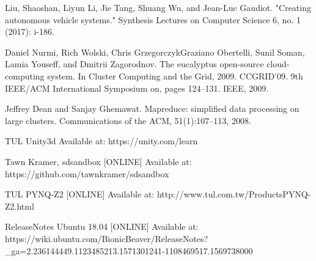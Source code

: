 \documentclass[conference]{IEEEtran}
\begin{document}
\begin{thebibliography}{00}

 Liu, Shaoshan, Liyun Li, Jie Tang, Shuang Wu, and Jean-Luc Gaudiot. "Creating autonomous vehicle systems." Synthesis Lectures on Computer Science 6, no. 1 (2017): i-186.

 Daniel Nurmi, Rich Wolski, Chris GrzegorczykGraziano Obertelli, Sunil Soman, Lamia Youseff, and Dmitrii Zagorodnov. The eucalyptus open-source cloud-computing system. In Cluster Computing and the Grid, 2009. CCGRID’09. 9th IEEE/ACM International Symposium on, pages 124–131. IEEE, 2009.

 Jeffrey Dean and Sanjay Ghemawat. Mapreduce: simplified data processing on large clusters. Communications
of the ACM, 51(1):107–113, 2008.

 TUL Unity3d Available at: https://unity.com/learn

 Tawn Kramer, sdsandbox [ONLINE] Available at: https://github.com/tawnkramer/sdsandbox

 TUL PYNQ-Z2 [ONLINE] Available at: http://www.tul.com.tw/ProductsPYNQ-Z2.html

 ReleaseNotes Ubuntu 18.04 [ONLINE] Available at: https://wiki.ubuntu.com/BionicBeaver/ReleaseNotes?\_ga=2.236144449.1123485213.1571301241-1108469517.1569738000


\end{thebibliography}
\end{document}

